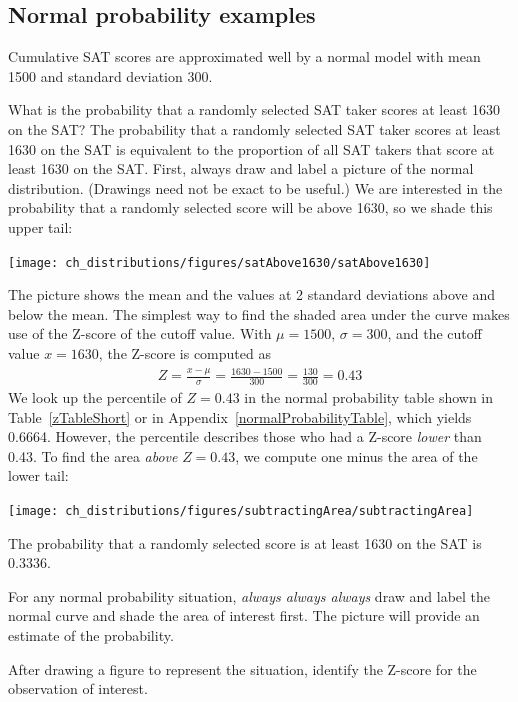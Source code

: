 \subsection{Normal probability examples}

Cumulative SAT scores are approximated well by a normal model with mean 1500 and standard deviation 300.

\begin{example}{What is the probability that a randomly selected SAT taker scores at least 1630 on the SAT?}\label{satAbove1630Exam}
The probability that a randomly selected SAT taker scores at least 1630 on the SAT is equivalent to the proportion of all SAT takers that score at least 1630 on the SAT. First, always draw and label a picture of the normal distribution. (Drawings need not be exact to be useful.) We are interested in the probability that a randomly selected score will be above 1630, so we shade this upper tail:
\begin{center}
\texttt{[image: ch\_distributions/figures/satAbove1630/satAbove1630]}
\end{center}
The picture shows the mean and the values at 2 standard deviations above and below the mean. The simplest way to find the shaded area under the curve makes use of the Z-score of the cutoff value. With $\mu=1500$, $\sigma=300$, and the cutoff value $x=1630$, the Z-score is computed as
\begin{eqnarray*}
Z = \frac{x - \mu}{\sigma} = \frac{1630 - 1500}{300} = \frac{130}{300} = 0.43
\end{eqnarray*}
We look up the percentile of $Z=0.43$ in the normal probability table shown in Table~\ref{zTableShort} or in Appendix~\vref{normalProbabilityTable}, which yields 0.6664. However, the percentile describes those who had a Z-score \emph{lower} than 0.43. To find the area \emph{above} $Z=0.43$, we compute one minus the area of the lower tail:
\begin{center}
\texttt{[image: ch\_distributions/figures/subtractingArea/subtractingArea]}
\end{center}
The probability that a randomly selected score is at least 1630 on the SAT is 0.3336.
\end{example}

\begin{tipBox}{
For any normal probability situation, \emph{always always always} draw and label the normal curve and shade the area of interest first. The picture will provide an estimate of the probability. \vspace{3mm}

After drawing a figure to represent the situation, identify the Z-score for the observation of interest.\vspace{1mm}}
\end{tipBox}

